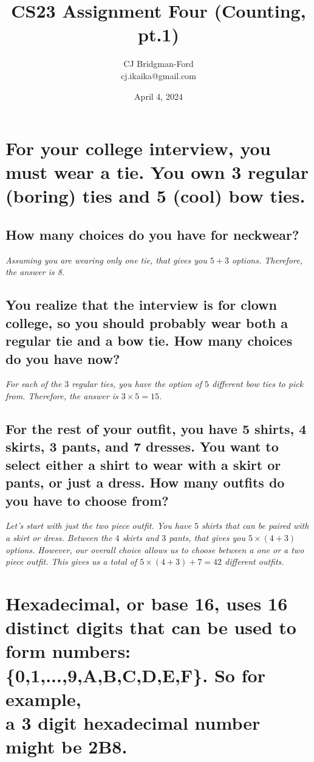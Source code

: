 \documentclass{article}
\title{CS23 Assignment Four (Counting, pt.1)}
\author{CJ Bridgman-Ford \\ cj.ikaika@gmail.com}
\date{April 4, 2024}
\begin{document}
\maketitle
\thispagestyle{empty}


\clearpage

\section{For your college interview, you must wear a tie.
    You own 3 regular (boring) ties and 5 (cool) bow ties.}
\subsection{How many choices do you have for neckwear?} 
\hspace{1cm}\textit{Assuming you are wearing only one tie, that gives you $5+3$ options.
    Therefore, the answer is 8.}
\subsection{You realize that the interview is for clown college,
    so you should probably wear both a regular tie and a bow tie. How many choices do you have now?}
 \hspace{1cm}\textit{For each of the $3$ regular ties, you have the option of $5$ different bow ties
    to pick from. Therefore, the answer is $3 \times 5 = 15$.}
\subsection{For the rest of your outfit, you have 5 shirts, 4 skirts, 3 pants, and 7 dresses.
    You want to select either a shirt to wear with a skirt or pants, or just a dress.
    How many outfits do you have to choose from?}
\hspace{1cm}\textit{Let's start with just the two piece outfit. You have $5$ shirts that can be paired
    with a skirt or dress. Between the $4$ skirts and $3$ pants, that gives you $5\times(4+3)$ options.
    However, our overall choice allows us to choose between a one or a two piece outfit. This gives us a
    total of $5\times(4+3)+7 = 42$ different outfits.}
\clearpage

\section{Hexadecimal, or base 16, uses 16 distinct digits that can be used to form numbers:
\\ \{0,1,...,9,A,B,C,D,E,F\}. So for example, \\ a 3 digit hexadecimal number might be 2B8.}
\end{document}
